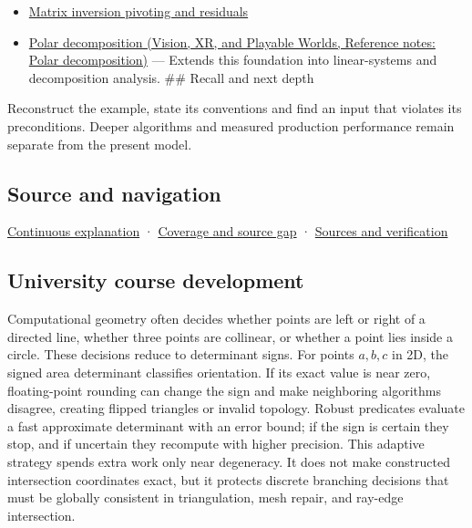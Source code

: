 \hypertarget{appendix-da478be01d02-used-by}{}

\begin{itemize}
\tightlist
\item
  \hyperref[appendix-48d2e66378ab]{Matrix inversion pivoting and residuals}
\item
  \href{../07-Vision-XR-and-Playable-Worlds/main.pdf\#nameddest=appendix-73f5bcf7a462}{Polar decomposition (Vision, XR, and Playable Worlds, Reference notes: Polar decomposition)} --- Extends this foundation into linear-systems and decomposition analysis. \#\# Recall and next depth
\end{itemize}

Reconstruct the example, state its conventions and find an input that violates its preconditions. Deeper algorithms and measured production performance remain separate from the present model.

\subsection{Source and navigation}\label{appendix-da478be01d02-source-and-navigation}

\hypertarget{appendix-da478be01d02-source-and-navigation}{}

\hyperref[01-foundations-i-ch018-keep-the-promises-visible-while-moving-between-representations]{Continuous explanation} · \hyperref[appendix-fd090d982a15-phase-7---parts-601-700]{Coverage and source gap} · \hyperref[appendix-a103e7846d21-phase-7---source-analysis-and-verification]{Sources and verification}

\subsection{University course development}\label{appendix-da478be01d02-university-course-development}

\hypertarget{appendix-da478be01d02-university-course-development}{}

Computational geometry often decides whether points are left or right of a directed line, whether three points are collinear, or whether a point lies inside a circle. These decisions reduce to determinant signs. For points \(a,b,c\) in 2D, the signed area determinant classifies orientation. If its exact value is near zero, floating-point rounding can change the sign and make neighboring algorithms disagree, creating flipped triangles or invalid topology. Robust predicates evaluate a fast approximate determinant with an error bound; if the sign is certain they stop, and if uncertain they recompute with higher precision. This adaptive strategy spends extra work only near degeneracy. It does not make constructed intersection coordinates exact, but it protects discrete branching decisions that must be globally consistent in triangulation, mesh repair, and ray-edge intersection.

